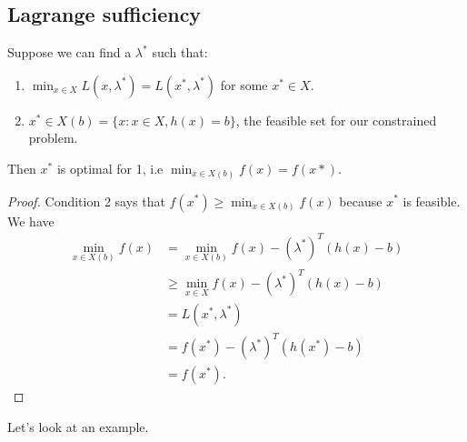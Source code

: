 \documentclass[a4paper]{scrartcl}
\begin{document}
\subsection{Lagrange sufficiency}

\begin{theorem}
	 Suppose we can find a $\lambda^*$ such that:
	 \begin{enumerate}
		\item $\min_{x \in X} L (x,\lambda^*)=L (x^*,\lambda^*)$ for some $x^* \in X$.
		\item $x^* \in X(b)=\{x: x \in X, h(x)=b\}$, the feasible set for our constrained problem.
	 \end{enumerate}
	 Then $x^*$ is optimal for 1, i.e $\min_{x \in X(b)}f (x)=f (x*)$.
	 
\end{theorem}
\begin{proof}
	 Condition 2 says that $f (x^*)\geq \min_{x \in X(b)}f (x)$ because $x^*$ is feasible. We have 
	 \begin{equation*}
		  \begin{split}
			\min_{x \in X(b)}f (x)&=\min_{x \in X(b)}f (x)-(\lambda^*)^T (h (x)-b)\\
			&\geq \min_{x \in X}f (x)-(\lambda^*)^T (h (x)-b)\\
			&=L (x^*,\lambda^*)\\
			&=f(x^*)-(\lambda^*)^T (h (x^*)-b)\\
			&=f (x^*).
		  \end{split}
	 \end{equation*}
	 
\end{proof}
Let's look at an example.
\end{document}
